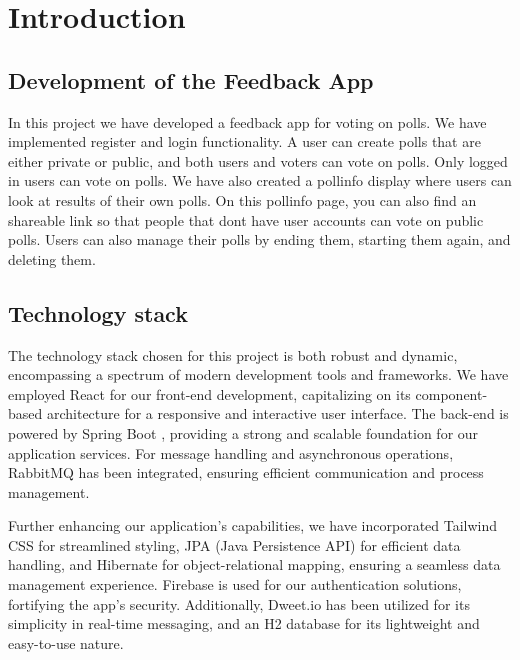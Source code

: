 \setlength{\parskip}{1em} %
\setlength{\parindent}{0pt} %

\section{Introduction}
\label{sec:introduction}

\subsection{Development of the Feedback App}
In this project we have developed a feedback app for voting on polls. We have implemented register and login functionality. A user can create polls that are either private or public, and both users and voters can vote on polls. 
Only logged in users can vote on polls. We have also created a pollinfo display where users can look at results of their own polls. On this pollinfo page, you can also find an shareable link so that people that dont have user accounts can vote on public polls. 
Users can also manage their polls by ending them, starting them again, and deleting them. 

\subsection{Technology stack}
The technology stack chosen for this project is both robust and dynamic, encompassing a spectrum of modern development tools and frameworks. 
We have employed React for our front-end development, capitalizing on its component-based architecture for a responsive and interactive user interface. 
The back-end is powered by Spring Boot \cite{springboot2023}, providing a strong and scalable foundation for our application services. For message handling and asynchronous operations, RabbitMQ \cite{rabbitmq2023} has been integrated, ensuring efficient communication and process management. 

Further enhancing our application's capabilities, we have incorporated Tailwind CSS \cite{tailwindcss2023} for streamlined styling, JPA (Java Persistence API) \cite{javatpointJPA2023} for efficient data handling, and Hibernate \cite{hibernate2023} for object-relational mapping, ensuring a seamless data management experience. 
Firebase \cite{firebase2023}  is used for our authentication solutions, fortifying the app's security. 
Additionally, Dweet.io has been utilized for its simplicity in real-time messaging, and an H2 database for its lightweight and easy-to-use nature.

